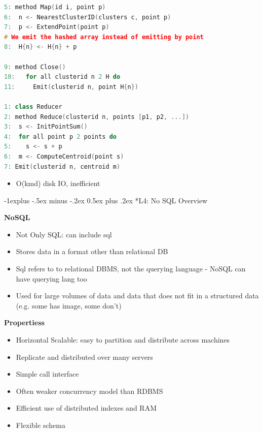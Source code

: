 \documentclass[10pt, landscape]{article}
\makeatletter
\renewcommand{\subsection}{\@startsection{subsection}{2}{0mm}%
                                {-1explus -.5ex minus -.2ex}%
                                {0.5ex plus .2ex}%
                                {\normalfont\normalsize\bfseries}}
\makeatother
\begin{document}
\begin{multicols}{4}
\begin{lstlisting}[language=C++, breaklines=true, breakatwhitespace=true]
5: method Map(id i, point p)
6:  n <- NearestClusterID(clusters c, point p)
7:  p <- ExtendPoint(point p)
# We emit the hashed array instead of emitting by point
8:  H{n} <- H{n} + p

9: method Close()
10:   for all clusterid n 2 H do
11:     Emit(clusterid n, point H{n})

1: class Reducer
2: method Reduce(clusterid n, points [p1, p2, ...])
3:  s <- InitPointSum()
4:  for all point p 2 points do
5:    s <- s + p
6:  m <- ComputeCentroid(point s)
7: Emit(clusterid n, centroid m)
\end{lstlisting}  
\begin{itemize}
  \item O(kmd) disk IO, inefficient
\end{itemize}

\subsection*{L4: No SQL Overview}

\textbf{NoSQL}
\begin{itemize}
  \item Not Only SQL: can include sql
  \item Stores data in a format other than relational DB 
  \item Sql refers to to relational DBMS, not the querying language - NoSQL can have querying lang too 
  \item Used for large volumes of data and data that does not fit in a structured data (e.g. some has image, some don't)
\end{itemize}

\textbf{Propertiess}
\begin{itemize}
  \item Horizontal Scalable: easy to partition and distribute across machines 
  \item Replicate and distributed over many servers 
  \item Simple call interface 
  \item Often weaker concurrency model than RDBMS 
  \item Efficient use of distributed indexes and RAM 
  \item Flexible schema
\end{itemize}



\end{multicols}
\end{document}
